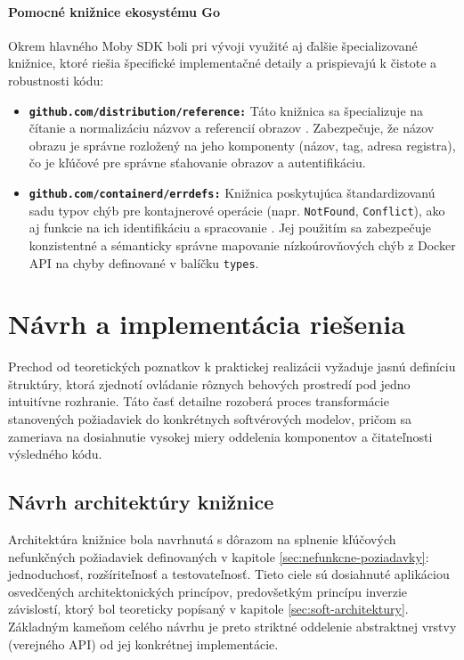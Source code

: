 \documentclass[
 program=infpvs,
  language=slovak,
  figures=false,
  tables=false,
  sourcecodes,
  glossaries,
  index
]{kidiplom}
\begin{document}
{\paragraph{Pomocné knižnice ekosystému Go}  \label{sec:pomocne-kniznice}
Okrem hlavného Moby SDK boli pri vývoji využité aj ďalšie špecializované knižnice, ktoré riešia špecifické implementačné detaily a prispievajú k čistote a robustnosti kódu:
\begin{itemize}
    \item \textbf{\texttt{github.com/distribution/reference:}} Táto knižnica sa špecializuje na čítanie a normalizáciu názvov a referencií obrazov \cite{dist-reference}. Zabezpečuje, že názov obrazu je správne rozložený na jeho komponenty (názov, tag, adresa registra), čo je kľúčové pre správne sťahovanie obrazov a autentifikáciu.
    \item \textbf{\texttt{github.com/containerd/errdefs:}} Knižnica poskytujúca štandardizovanú sadu typov chýb pre kontajnerové operácie (napr. \texttt{NotFound}, \texttt{Conflict}), ako aj funkcie na ich identifikáciu a spracovanie \cite{errdefs}. Jej použitím sa zabezpečuje konzistentné a sémanticky správne mapovanie nízkoúrovňových chýb z Docker API na chyby definované v balíčku \texttt{types}.
\end{itemize}



\section{Návrh a implementácia riešenia}  \label{sec:navrh-implementacia}
Prechod od teoretických poznatkov k praktickej realizácii vyžaduje jasnú definíciu štruktúry, ktorá zjednotí ovládanie rôznych behových prostredí pod jedno intuitívne rozhranie. Táto časť detailne rozoberá proces transformácie stanovených požiadaviek do konkrétnych softvérových modelov, pričom sa zameriava na dosiahnutie vysokej miery oddelenia komponentov a čitateľnosti výsledného kódu.



\subsection{Návrh architektúry knižnice}  \label{sec:navrh-arch}
Architektúra knižnice bola navrhnutá s dôrazom na splnenie kľúčových nefunkčných požiadaviek definovaných v kapitole \ref{sec:nefunkcne-poziadavky}: jednoduchosť, rozšíriteľnosť a testovateľnosť. Tieto ciele sú dosiahnuté aplikáciou osvedčených architektonických princípov, predovšetkým princípu inverzie závislostí, ktorý bol teoreticky popísaný v kapitole \ref{sec:soft-architektury}. Základným kameňom celého návrhu je preto striktné oddelenie abstraktnej vrstvy (verejného API) od jej konkrétnej implementácie.



}
\end{document}
